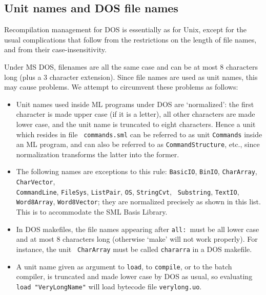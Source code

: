 \documentclass[fleqn]{article}
\begin{document}
\subsection{Unit names and DOS file names}

Recompilation management for DOS is essentially as for Unix, except
for the usual complications that follow from the restrictions on the
length of file names, and from their case-insensitivity.

Under MS DOS, filenames are all the same case and can be at most 8
characters long (plus a 3 character extension).  Since file names are
used as unit names, this may cause problems.  We attempt to circumvent
these problems as follows:

\begin{itemize}
\item Unit names used inside ML programs under DOS are `normalized':
  the first character is made upper case (if it is a letter), all
  other characters are made lower case, and the unit name is truncated
  to eight characters.  Hence a unit which resides in file {\tt
    commands.sml} can be referred to as unit {\tt Commands} inside an
  ML program, and can also be referred to as {\tt CommandStructure},
  etc., since normalization transforms the latter into the former.

\item The following names are exceptions to this rule: {\tt BasicIO},
  {\tt BinIO}, {\tt CharArray}, {\tt CharVector},\\ {\tt CommandLine},
  {\tt FileSys}, {\tt ListPair}, {\tt OS}, {\tt StringCvt}, {\tt
    Substring}, {\tt TextIO}, {\tt Word8Array}, {\tt Word8Vector};
  they are normalized precisely as shown in this list.  This is to
  accommodate the SML Basis Library.

\item In DOS makefiles, the file names appearing after {\tt all:}\
  must be all lower case and at most 8 characters long (otherwise
  `make' will not work properly).  For instance, the unit {\tt
    CharArray} must be called {\tt chararra} in a DOS makefile.

\item A unit name given as argument to {\tt load}, to {\tt compile},
  or to the batch compiler, is truncated and made lower case by DOS as
  usual, so evaluating {\tt load "VeryLongName"} will load bytecode
  file {\tt verylong.uo}.
\end{itemize}

\newpage
\end{document}
